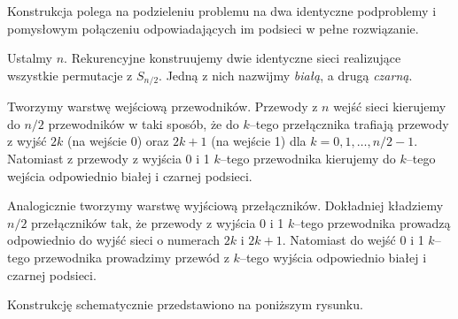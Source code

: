 \documentclass[a4paper]{article}
\theoremstyle{definition}
\begin{document}
Konstrukcja polega na podzieleniu problemu na dwa identyczne podproblemy i pomysłowym połączeniu odpowiadających im podsieci w pełne rozwiązanie.

\vspace{.5em}

Ustalmy \(n\). Rekurencyjne konstruujemy dwie identyczne sieci realizujące wszystkie permutacje z \(S_{n/2}\). Jedną z nich nazwijmy \emph{białą}, a drugą \emph{czarną}. 

\vspace{.5em}

Tworzymy warstwę wejściową przewodników. Przewody z \(n\) wejść sieci kierujemy do \(n/2\) przewodników w taki sposób, że do \(k\)--tego przełącznika trafiają przewody z wyjść \(2k\) (na wejście 0) oraz \(2k+1\) (na wejście 1) dla \(k = 0, 1, \ldots, n/2 - 1\). Natomiast z przewody z wyjścia 0 i 1 \(k\)--tego przewodnika kierujemy do \(k\)--tego wejścia odpowiednio białej i czarnej podsieci. 

\vspace{.5em}

Analogicznie tworzymy warstwę wyjściową przełączników. Dokładniej kładziemy \(n/2\) przełączników tak, że przewody z wyjścia 0 i 1 \(k\)--tego przewodnika prowadzą odpowiednio do wyjść sieci o numerach \(2k\) i \(2k+1\). Natomiast do wejść 0 i 1 \(k\)--tego przewodnika prowadzimy przewód z \(k\)--tego wyjścia odpowiednio białej i czarnej podsieci. 

\vspace{.5em}

Konstrukcję schematycznie przedstawiono na poniższym rysunku.
\end{document}
